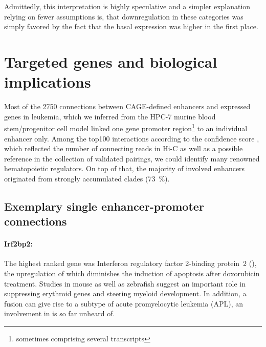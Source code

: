 Admittedly, this interpretation is highly speculative and a simpler explanation relying on fewer assumptions is, that downregulation in these categories was simply favored by the fact that the basal expression was higher in the first place.  
  
\section{Targeted genes and biological implications}
\label{chap:r:enhancers:targets:genes}

Most of the \num{2750} connections between CAGE-defined enhancers and expressed genes in \mllafnine leukemia, which we inferred from the  HPC-7 murine blood stem/progenitor cell model\cite{Wilson2016} linked one gene promoter region\footnote{sometimes comprising several transcripts} to an individual enhancer only. Among the top\num{100} interactions according to the confidence score , which reflected the number of connecting reads in Hi-C as well as a possible reference in the  collection of validated pairings\cite{Hait2018}, we could identify many renowned hematopoietic regulators. On top of that, the majority of involved enhancers originated from strongly accumulated clades (\SI{73}{\percent}).

\subsection{Exemplary single enhancer-promoter connections}
\label{chap:r:enhancers:targets:genes:single}

\paragraph{Irf2bp2:} The highest ranked gene was Interferon regulatory factor 2-binding protein~2 (), the upregulation of which diminishes the induction of apoptosis after doxorubicin treatment\cite{Koeppel2009}. Studies in mouse as well as zebrafish suggest an important role in suppressing erythroid genes and steering myeloid development\cite{Stadhouders2015,Wang2019}. In addition,  a  fusion can give rise to a subtype of acute promyelocytic leukemia (APL)\cite{Jovanovic2017}, an involvement in \mllafnine is so far unheard of. 

